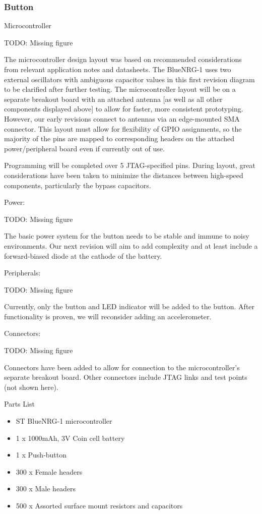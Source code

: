 \documentclass[journal]{IEEEtran}
\begin{document}
\subsubsection{Button}

Microcontroller

TODO: Missing figure

The microcontroller design layout was based on recommended considerations from relevant application notes and datasheets.  The BlueNRG-1 uses two external oscillators with ambiguous capacitor values in this first revision diagram to be clarified after further testing.  The microcontroller layout will be on a separate breakout board with an attached antenna [as well as all other components displayed above] to allow for faster, more consistent prototyping.  However, our early revisions connect to antennas via an edge-mounted SMA connector.  This layout must allow for flexibility of GPIO assignments, so the majority of the pins are mapped to corresponding headers on the attached power/peripheral board even if currently out of use.

Programming will be completed over 5 JTAG-specified pins.  During layout, great considerations have been taken to minimize the distances between high-speed components, particularly the bypass capacitors.

Power:

TODO: Missing figure

The basic power system for the button needs to be stable and immune to noisy environments.  Our next revision will aim to add complexity and at least include a forward-biased diode at the cathode of the battery.

Peripherals:

TODO: Missing figure

Currently, only the button and LED indicator will be added to the button.  After functionality is proven, we will reconsider adding an accelerometer.

Connectors:

TODO: Missing figure

Connectors have been added to allow for connection to the microcontroller’s separate breakout board.  Other connectors include JTAG links and test points (not shown here).

Parts List
\begin{itemize}
  \item ST BlueNRG-1 microcontroller
  \item 1 x 1000mAh, 3V Coin cell battery
  \item 1 x Push-button
  \item 300 x Female headers
  \item 300 x Male headers
  \item 500 x Assorted surface mount resistors and capacitors
\end{itemize}
\end{document}
